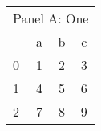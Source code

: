 \begin{tabular}{lccc}
\toprule
\multicolumn{4}{l}{Panel A: One}\\
  & a & b & c\\
\midrule
0 & 1 & 2 & 3 \\
1 & 4 & 5 & 6 \\
2 & 7 & 8 & 9 \\
\bottomrule

\end{tabular}